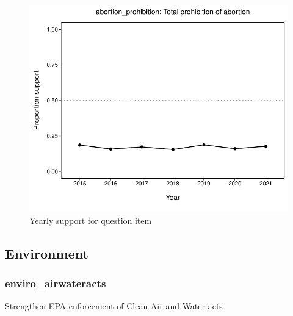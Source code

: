 \documentclass[
  12pt]{article}
\begin{document}
\begin{figure}

{\centering \includegraphics{error-checking_files/figure-latex/unnamed-chunk-3-6} 

}

\caption{Yearly support for question item}\label{fig:unnamed-chunk-3-6}
\end{figure}

\newpage

\hypertarget{environment}{%
\subsection{Environment}\label{environment}}

\hypertarget{enviro_airwateracts}{%
\subsubsection{enviro\_airwateracts}\label{enviro_airwateracts}}

Strengthen EPA enforcement of Clean Air and Water acts
\end{document}
